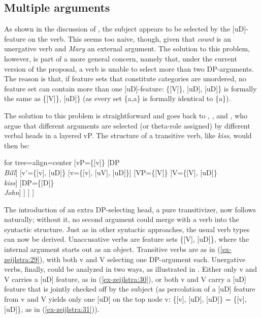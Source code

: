 \documentclass[output=paper
,modfonts
,nonflat]{langsci/langscibook}
\begin{document}
\subsection{Multiple arguments} \label{sec-zeijlstra:3.5}
As shown in the discussion of , the subject appears to be selected by the [uD]-feature on the verb. This seems too naive, though, given that \textit{count} is an unergative verb and \textit{Mary} an external argument. The solution to this problem, however, is part of a more general concern, namely that, under the current version of the proposal, a verb is unable to select more than two DP-arguments. The reason is that, if feature sets that constitute categories are unordered, no feature set can contain more than one [uD]-feature: \{[V]\}, [uD], [uD]\} is formally the same as \{[V]\}, [uD]\} (as every set \{a,a\} is formally identical to \{a\}).

The solution to this problem is straightforward and goes back to \citet{Larson1988},  \citet{Hale_Keyser1993}, and \citet{Kratzer1996}, who argue that different arguments are selected (or theta-role assigned) by different verbal heads in a layered vP. The structure of a transitive verb, like \textit{kiss}, would then be: 

	\begin{exe}
    \ex\label{ex-zeijlstra:29}
			\begin{forest}	for tree={align=center}
				[vP{=}\{{[}v{]}\}
				[DP\\ \textit{Bill}]
				[v'{=}\{{[}v{]}{,} {[}uD{]}\}
				[v{=}\{{[}v{]}{,} {[}uV{]}{,} {[}uD{]}\}]
				[VP{=}\{{[}V{]}\} 
				[V{=}\{{[}V{]}{,} {[}uD{]}\}\\\textit{kiss}]
				[DP{=}\{{[}D{]}\}\\ \textit{John}]
				] ] ] 
		\end{forest}
	\end{exe}
\noindent The introduction of an extra DP-selecting head, a pure transitivizer, now follows naturally; without it, no second argument could merge with a verb into the syntactic structure. Just as in other syntactic approaches, the usual verb types can now be derived. Unaccusative verbs are feature sets \{[V], [uD]\}, where the internal argument starts out as an object. Transitive verbs are as in (\ref{ex-zeijlstra:29}), with both v and V selecting one DP-argument each. Unergative verbs, finally, could be analyzed in two ways, as illustrated in . Either only v and V carries a [uD] feature, as in (\ref{ex-zeijlstra:30}), or both v and V carry a [uD] feature that is jointly checked off by the subject (as percolation of a [uD] feature from v and V yields only one [uD] on the top node v: \{[v], [uD], [uD]\} = \{[v], [uD]\}, as in (\ref{ex-zeijlstra:31})).
\end{document}
